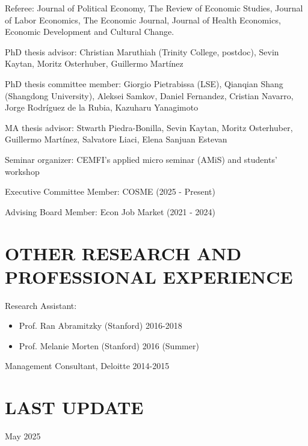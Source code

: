 \documentclass[margin]{res} %
\begin{document}
\begin{resume}
Referee: Journal of Political Economy, The Review of Economic Studies, Journal of Labor Economics, The Economic Journal, Journal of Health Economics, Economic Development and Cultural Change.

PhD thesis advisor: Christian Maruthiah (Trinity College, postdoc), Sevin Kaytan, Moritz Osterhuber, Guillermo Martínez

PhD thesis committee member: Giorgio Pietrabissa (LSE), Qianqian Shang (Shangdong University), Aleksei Samkov, Daniel Fernandez, Cristian Navarro, Jorge Rodríguez de la Rubia, Kazuharu Yanagimoto

MA thesis advisor: Stwarth Piedra-Bonilla, Sevin Kaytan, Moritz Osterhuber, Guillermo Martínez, Salvatore Liaci, Elena Sanjuan Estevan

Seminar organizer: CEMFI's applied micro seminar (AMiS) and students' workshop 

Executive Committee Member: COSME (2025 - Present)

Advising Board Member: Econ Job Market (2021 - 2024)

 
\section{OTHER RESEARCH AND PROFESSIONAL EXPERIENCE}
 Research Assistant:
\begin{itemize}
	\item Prof. Ran Abramitzky (Stanford) \hfill 2016-2018
	\item Prof. Melanie Morten (Stanford) \hfill 2016 (Summer)
\end{itemize}
 
 Management Consultant, Deloitte \hfill 2014-2015 

\section{LAST UPDATE} 
May 2025

\end{resume}
\end{document}
